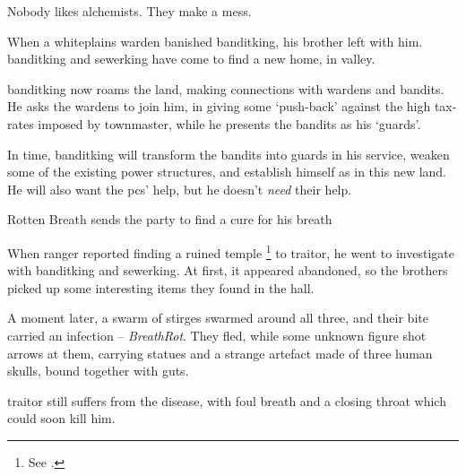 \label{entitlement}


\begin{exampletext}
  \noindent
  Nobody likes alchemists.
  They make a mess.

  When a \gls{whiteplains} \gls{warden} banished \gls{banditking}, his brother left with him.
  \Gls{banditking} and \gls{sewerking} have come to find a new home, in \gls{valley}.

  \Gls{banditking} now roams the land, making connections with \glspl{warden} and bandits.
  He asks the \glspl{warden} to join him, in giving some `push-back' against the high tax-rates imposed by \gls{townmaster}, while he presents the bandits as his `guards'.
\end{exampletext}

In time, \gls{banditking} will transform the bandits into \glspl{guard} in his service, weaken some of the existing power structures, and establish himself as  in this new land.
He will also want the \glspl{pc}' help, but he doesn't \emph{need} their help.

{Rotten Breath}%
{ sends the party to find a cure for his breath}%
\label{rottenBreath}

\begin{exampletext}
  When  \gls{ranger} reported finding a ruined temple%
  \footnote{See .}
  to \gls{traitor}, he went to investigate with \gls{banditking} and \gls{sewerking}.
  At first, it appeared abandoned, so the brothers picked up some interesting items they found in the hall.

  A moment later, a swarm of stirges swarmed around all three, and their bite carried an infection -- \textit{BreathRot}.%
  They fled, while some unknown figure shot arrows at them, carrying statues and a strange \gls{artefact} made of three human skulls, bound together with guts.

  \Gls{traitor} still suffers from the disease, with foul breath and a closing throat which could soon kill him.
\end{exampletext}

